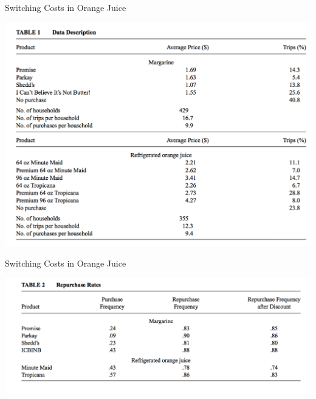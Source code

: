 \documentclass[xcolor=pdftex,dvipsnames,table,mathserif,aspectratio=169]{beamer}
\begin{document}
\begin{frame}{Switching Costs in Orange Juice}
\begin{center}
\includegraphics[scale=0.5]{resources/oj_t1.png}
\end{center}
\end{frame}

\begin{frame}{Switching Costs in Orange Juice}
\begin{center}
\includegraphics[scale=0.5]{resources/oj_t2.png}
\end{center}
\end{frame}
\end{document}
